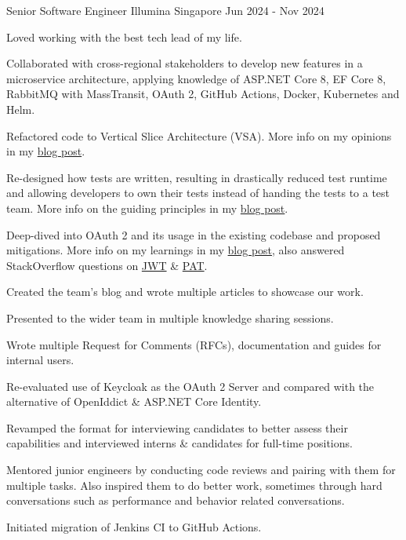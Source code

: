 \begin{cventries}
\cventry
{Senior Software Engineer} %
{Illumina} %
{Singapore} %
{Jun 2024 - Nov 2024} %
{
  \begin{cvitems} %
    \item {Loved working with the best tech lead of my life.}
    \item {Collaborated with cross-regional stakeholders to develop new features in a microservice architecture, applying knowledge of ASP.NET Core 8, EF Core 8, RabbitMQ with MassTransit, OAuth 2, GitHub Actions, Docker, Kubernetes and Helm.}
    \item {Refactored code to Vertical Slice Architecture (VSA). More info on my opinions in my \href{https://bit.ly/zy-vsa}{blog post}.}
    \item {Re-designed how tests are written, resulting in drastically reduced test runtime and allowing developers to own their tests instead of handing the tests to a test team. More info on the guiding principles in my \href{https://bit.ly/zy-tests}{blog post}.}
    \item {Deep-dived into OAuth 2 and its usage in the existing codebase and proposed mitigations. More info on my learnings in my \href{https://bit.ly/zy-oauth2}{blog post}, also answered StackOverflow questions on \href{https://bit.ly/zy-jwt}{JWT} \& \href{https://bit.ly/zy-pat}{PAT}.}
    \item {Created the team's blog and wrote multiple articles to showcase our work.}
    \item {Presented to the wider team in multiple knowledge sharing sessions.}
    \item {Wrote multiple Request for Comments (RFCs), documentation and guides for internal users.}
    \item {Re-evaluated use of Keycloak as the OAuth 2 Server and compared with the alternative of OpenIddict \& ASP.NET Core Identity.}
    \item {Revamped the format for interviewing candidates to better assess their capabilities and interviewed interns \& candidates for full-time positions.}
    \item {Mentored junior engineers by conducting code reviews and pairing with them for multiple tasks. Also inspired them to do better work, sometimes through hard conversations such as performance and behavior related conversations.}
    \item {Initiated migration of Jenkins CI to GitHub Actions.}
  \end{cvitems}
}


\end{cventries}
